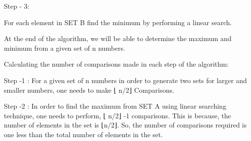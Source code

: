 \documentclass[letterpaper,portrait,12pt]{article}
\begin{document}
\begin{flushleft}

\end{flushleft}


\begin{flushleft}
Step - 3:
\end{flushleft}


\begin{flushleft}
For each element in SET B find the minimum by performing a linear search.
\end{flushleft}


\begin{flushleft}

\end{flushleft}


\begin{flushleft}
At the end of the algorithm, we will be able to determine the maximum and minimum from a given set of n numbers.
\end{flushleft}


\begin{flushleft}

\end{flushleft}


\begin{flushleft}
Calculating the number of comparisons made in each step of the algorithm:
\end{flushleft}


\begin{flushleft}

\end{flushleft}


\begin{flushleft}
Step -1 : For a given set of n numbers in order to generate two sets for larger and smaller numbers, one needs to make ⌊ n/2⌋ Comparisons.
\end{flushleft}


\begin{flushleft}

\end{flushleft}


\begin{flushleft}
Step -2 :  In order to find the maximum from SET A using linear searching technique, one needs to perform, ⌊ n/2⌋ -1 comparisons. This is because, the number of elements in the set is ⌊n/2⌋. So, the number of comparisons required is one less than the total number of elements in the set.
\end{flushleft}
\end{document}
